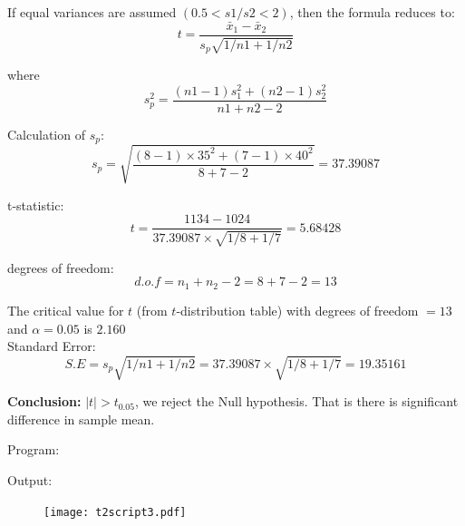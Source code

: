 \documentclass[a4paper,11pt,openright]{report}
\begin{document}
\begin{enumerate}
If equal variances are assumed $(0.5 < s1/s2 < 2)$, then the formula reduces to:
\begin{equation*}
t = \frac{\bar x_{1} - \bar x_{2}}{s_{p} \sqrt{1/n1 + 1/n2}}
\end{equation*}

where
\begin{equation*}
s_{p}^{2} = \frac{(n1-1)s_{1}^{2} + (n2-1)s_{2}^{2}}{n1+n2-2}
\end{equation*}

Calculation of $s_{p}$:
\begin{equation*}
s_{p} = \sqrt{\frac{(8-1) \times 35^{2} + (7-1) \times 40^{2}}{8+7-2}} 
      = 37.39087
\end{equation*}

t-statistic:
\begin{equation*}
t = \frac{1134 - 1024}{37.39087 \times \sqrt{1/8 + 1/7}} = 5.68428
\end{equation*}

degrees of freedom:
\begin{equation*}
d.o.f = n_{1} + n_{2} - 2 = 8 + 7 - 2 = 13
\end{equation*}

The critical value for $t$ (from $t$-distribution table) with degrees of freedom $= 13$ and 
$\alpha = 0.05$ is $2.160$ \\

Standard Error:
\begin{equation*}
S.E = s_{p} \sqrt{1/n1 + 1/n2} = 37.39087 \times \sqrt{1/8 + 1/7} = 19.35161
\end{equation*}

\textbf{Conclusion:} $|t| > t_{0.05}$, we reject the Null hypothesis. That is there is 
significant difference in sample mean.

\vspace{2cm}

Program:


\vspace{1cm}

Output:


\begin{figure}[ht!]
\texttt{[image: t2script3.pdf]}
\centering
\end{figure}


%
%
%
%
%
%

\end{enumerate}
\end{document}
